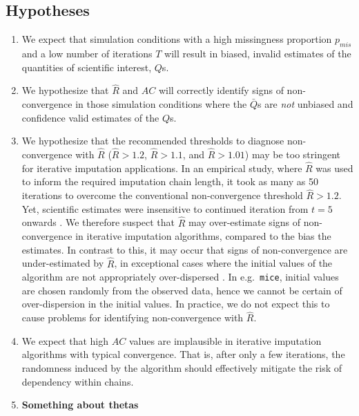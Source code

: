 \documentclass[Royal,times,sageh]{sagej}
\begin{document}
\hypertarget{hypotheses}{%
\subsection{Hypotheses}\label{hypotheses}}

\begin{enumerate}
\def\labelenumi{\arabic{enumi}.}
\item
  We expect that simulation conditions with a high missingness
  proportion \(p_{mis}\) and a low number of iterations \(T\) will
  result in biased, invalid estimates of the quantities of scientific
  interest, \(Q\)s.
\item
  We hypothesize that \(\widehat{R}\) and \(AC\) will correctly identify
  signs of non-convergence in those simulation conditions where the
  \(\bar{Q}\)s are \emph{not} unbiased and confidence valid estimates of
  the \(Q\)s.
\item
  We hypothesize that the recommended thresholds to diagnose
  non-convergence with \(\widehat{R}\) (\(\widehat{R} > 1.2\),
  \(\widehat{R} > 1.1\), and \(\widehat{R} > 1.01\)) may be too
  stringent for iterative imputation applications. In an empirical
  study, where \(\widehat{R}\) was used to inform the required
  imputation chain length, it took as many as 50 iterations to overcome
  the conventional non-convergence threshold \(\widehat{R}>1.2\). Yet,
  scientific estimates were insensitive to continued iteration from
  \(t=5\) onwards \citep{lace07}. We therefore suspect that
  \(\widehat{R}\) may over-estimate signs of non-convergence in
  iterative imputation algorithms, compared to the bias the estimates.
  In contrast to this, it may occur that signs of non-convergence are
  under-estimated by \(\widehat{R}\), in exceptional cases where the
  initial values of the algorithm are not appropriately over-dispersed
  \citep[p.~437]{broo98}. In e.g.~\texttt{mice}, initial values are
  chosen randomly from the observed data, hence we cannot be certain of
  over-dispersion in the initial values. In practice, we do not expect
  this to cause problems for identifying non-convergence with
  \(\widehat{R}\).
\item
  We expect that high \(AC\) values are implausible in iterative
  imputation algorithms with typical convergence. That is, after only a
  few iterations, the randomness induced by the algorithm should
  effectively mitigate the risk of dependency within chains.
\item
  \textbf{Something about thetas}
\end{enumerate}
\end{document}
